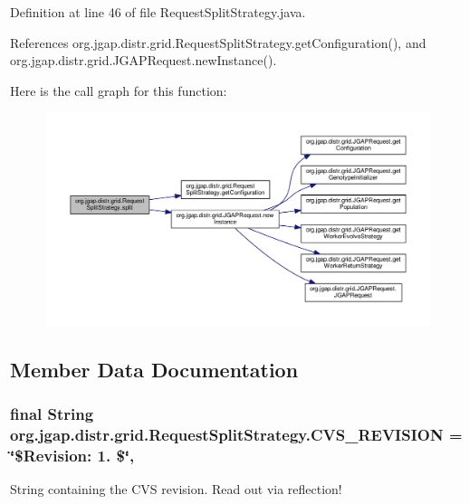 Definition at line 46 of file Request\-Split\-Strategy.\-java.



References org.\-jgap.\-distr.\-grid.\-Request\-Split\-Strategy.\-get\-Configuration(), and org.\-jgap.\-distr.\-grid.\-J\-G\-A\-P\-Request.\-new\-Instance().



Here is the call graph for this function\-:
\nopagebreak
\begin{figure}[H]
\begin{center}
\leavevmode
\includegraphics[width=350pt]{classorg_1_1jgap_1_1distr_1_1grid_1_1_request_split_strategy_afa4582eef1f6ae141ff15d706cf7ec68_cgraph}
\end{center}
\end{figure}




\subsection{Member Data Documentation}
\hypertarget{classorg_1_1jgap_1_1distr_1_1grid_1_1_request_split_strategy_a0bb126497048ce401d8b2f534ef92200}{
\subsubsection[{C\-V\-S\-\_\-\-R\-E\-V\-I\-S\-I\-O\-N}]{\setlength{\rightskip}{0pt plus 5cm}final String org.\-jgap.\-distr.\-grid.\-Request\-Split\-Strategy.\-C\-V\-S\-\_\-\-R\-E\-V\-I\-S\-I\-O\-N = \char`\"{}\$Revision\-: 1. \$\char`\"{}\hspace{0.3cm}{\ttfamily [static]}, {\ttfamily [private]}}}\label{classorg_1_1jgap_1_1distr_1_1grid_1_1_request_split_strategy_a0bb126497048ce401d8b2f534ef92200}
String containing the C\-V\-S revision. Read out via reflection! 

